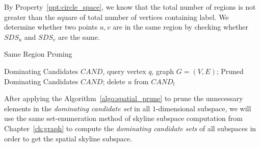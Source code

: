 By Property~\ref{ppt:circle_space}, we know that the total number of regions is not greater than the square of total number of vertices containing label. We determine whether two points $u, v$ are in the same region by checking whether $SDS_u$ and $SDS_v$ are the same.

\begin{algorithm}[H]
  \caption{Same Region Pruning}
  \label{algo:spatial_prune}
  \begin{algorithmic}[1]
  \show\LOOP
    \REQUIRE Dominating Candidates $CAND$, query vertex $q$, graph $G=(V, E)$;
    \ENSURE Pruned Dominating Candidates $CAND$;
                \STATE delete $u$ from $CAND_l$
            \ENDIF
        \ENDFOR
    \ENDFOR
  \end{algorithmic}
\end{algorithm}

After applying the Algorithm~\ref{algo:spatial_prune} to prune the unnecessary elements in the \emph{dominating candidate set} in all $1$-dimensional subspace, we will use the same set-enumeration method of skyline subspace computation from Chapter~\ref{ch:graph} to compute the \emph{dominating candidate sets} of all subspaces in order to get the spatial skyline subspace.










